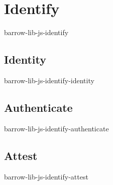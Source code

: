 \section{Identify}
barrow-lib-js-identify

\subsection{Identity}
barrow-lib-js-identify-identity

\subsection{Authenticate}
barrow-lib-js-identify-authenticate

\subsection{Attest}
barrow-lib-js-identify-attest
